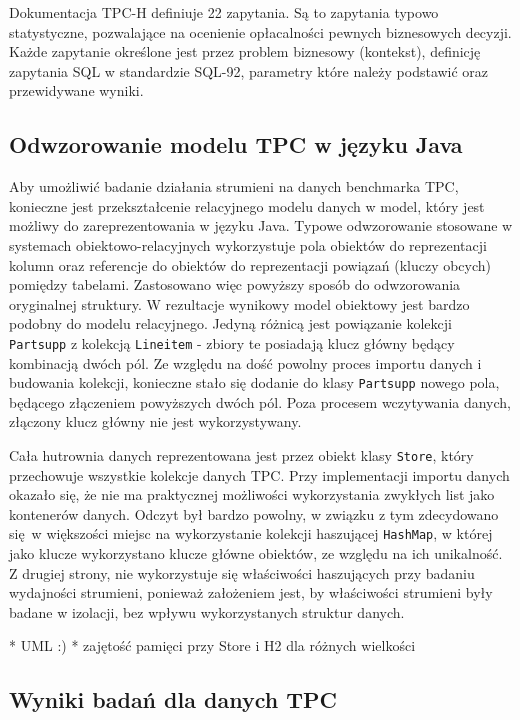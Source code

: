 \documentclass[12pt]{extarticle}
\begin{document}
    Dokumentacja TPC-H definiuje 22 zapytania. Są to zapytania typowo statystyczne, pozwalające na ocenienie opłacalności pewnych biznesowych decyzji. Każde zapytanie określone jest przez problem biznesowy (kontekst), definicję zapytania SQL w standardzie SQL-92, parametry które należy podstawić oraz przewidywane wyniki.

\subsection{Odwzorowanie modelu TPC w języku Java}

    Aby umożliwić badanie działania strumieni na danych benchmarka TPC, konieczne jest przekształcenie relacyjnego modelu danych w model, który jest możliwy do zareprezentowania w języku Java. Typowe odwzorowanie stosowane w systemach obiektowo-relacyjnych wykorzystuje pola obiektów do reprezentacji kolumn oraz referencje do obiektów do reprezentacji powiązań (kluczy obcych) pomiędzy tabelami. Zastosowano więc powyższy sposób do odwzorowania oryginalnej struktury. W rezultacje wynikowy model obiektowy jest bardzo podobny do modelu relacyjnego. Jedyną różnicą jest powiązanie kolekcji \texttt{Partsupp} z kolekcją \texttt{Lineitem} - zbiory te posiadają klucz główny będący kombinacją dwóch pól. Ze względu na dość powolny proces importu danych i budowania kolekcji, konieczne stało się dodanie do klasy \texttt{Partsupp} nowego pola, będącego złączeniem powyższych dwóch pól. Poza procesem wczytywania danych, złączony klucz główny nie jest wykorzystywany.

    Cała hutrownia danych reprezentowana jest przez obiekt klasy \texttt{Store}, który przechowuje wszystkie kolekcje danych TPC. Przy implementacji importu danych okazało się, że nie ma praktycznej możliwości wykorzystania zwykłych list jako kontenerów danych. Odczyt był bardzo powolny, w związku z tym zdecydowano się w większości miejsc na wykorzystanie kolekcji haszującej \texttt{HashMap}, w której jako klucze wykorzystano klucze główne obiektów, ze względu na ich unikalność. Z drugiej strony, nie wykorzystuje się właściwości haszujących przy badaniu wydajności strumieni, ponieważ założeniem jest, by właściwości strumieni były badane w izolacji, bez wpływu wykorzystanych struktur danych.

    * UML :)
* zajętość pamięci przy Store i H2 dla różnych wielkości



\subsection{Wyniki badań dla danych TPC}
\end{document}
